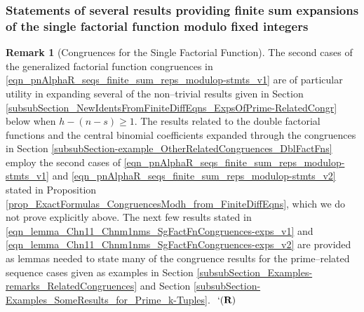 \documentclass[12pt,reqno]{article}
\numberwithin{sfootnote}{section}
\numberwithin{equation}{section}
\theoremstyle{DefaultTheoremStyle}
\theoremstyle{definition}
\newtheorem{remark}[theorem]{Remark}
\newcommand{\eolqedsymbol}[1]{{\hrulefill\ensuremath{\ #1}}}
\renewcommand{\eolqedsymbol}[1]{{\mboxfill{ }\ensuremath{\ #1}}}
\newcommand{\RemarkQEDSymbol}{`(\text{\rm{\bf R}})}
\newcommand{\RemarkQED}{\eolqedsymbol{\RemarkQEDSymbol}}
\begin{document}
\subsubsection{Statements of several 
               results providing finite sum expansions of the 
               single factorial function modulo fixed integers} 

\begin{remark}[Congruences for the Single Factorial Function]  
\label{remark_lemma_new_congruences_for_the_SgFactFn} 
The second cases of the generalized factorial function congruences in 
\eqref{eqn_pnAlphaR_seqs_finite_sum_reps_modulop-stmts_v1} 
are of particular utility in expanding several of the non--trivial 
results given in 
Section \ref{subsubSection_NewIdentsFromFiniteDiffEqns_ExpsOfPrime-RelatedCongr} 
below when $h - (n-s) \geq 1$. 
The results related to the double factorial functions and the 
central binomial coefficients expanded through the congruences in 
Section \ref{subsubSection-example_OtherRelatedCongruences_DblFactFns} 
employ the second cases of 
\eqref{eqn_pnAlphaR_seqs_finite_sum_reps_modulop-stmts_v1} and 
\eqref{eqn_pnAlphaR_seqs_finite_sum_reps_modulop-stmts_v2} stated in 
Proposition \ref{prop_ExactFormulas_CongruencesModh_from_FiniteDiffEqns}, 
which we do not prove explicitly above. 
The next few results stated in 
\eqref{eqn_lemma_Chn11_Chnm1nms_SgFactFnCongruences-exps_v1} and 
\eqref{eqn_lemma_Chn11_Chnm1nms_SgFactFnCongruences-exps_v2} are 
provided as lemmas needed to state many of the congruence results for the 
prime--related sequence cases given as examples in 
Section \ref{subsubSection_Examples-remarks_RelatedCongruences} and 
Section \ref{subsubSection-Examples_SomeResults_for_Prime_k-Tuples}. 
\RemarkQED 
\end{remark} 
\end{document}
